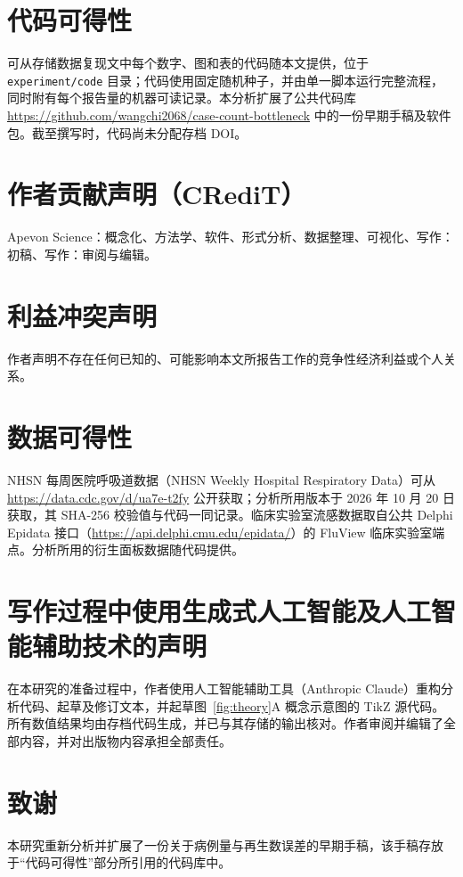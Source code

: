 \section*{代码可得性}
可从存储数据复现文中每个数字、图和表的代码随本文提供，位于 \texttt{experiment/code} 目录；代码使用固定随机种子，并由单一脚本运行完整流程，同时附有每个报告量的机器可读记录。本分析扩展了公共代码库 {\def\UrlBreaks{\do\/\do-}\url{https://github.com/wangchi2068/case-count-bottleneck}} 中的一份早期手稿及软件包。截至撰写时，代码尚未分配存档 DOI。

\section*{作者贡献声明（CRediT）}
Apevon Science：概念化、方法学、软件、形式分析、数据整理、可视化、写作：初稿、写作：审阅与编辑。

\section*{利益冲突声明}
作者声明不存在任何已知的、可能影响本文所报告工作的竞争性经济利益或个人关系。

\section*{数据可得性}
{\sloppy NHSN 每周医院呼吸道数据（NHSN Weekly Hospital Respiratory Data）可从 \url{https://data.cdc.gov/d/ua7e-t2fy} 公开获取；分析所用版本于 2026 年 10 月 20 日获取，其 SHA-256 校验值与代码一同记录。临床实验室流感数据取自公共 Delphi Epidata 接口（\mbox{\url{https://api.delphi.cmu.edu/epidata/}}）的 FluView 临床实验室端点。分析所用的衍生面板数据随代码提供。\par}

\section*{写作过程中使用生成式人工智能及人工智能辅助技术的声明}
在本研究的准备过程中，作者使用人工智能辅助工具（Anthropic Claude）重构分析代码、起草及修订文本，并起草图~\ref{fig:theory}A 概念示意图的 TikZ 源代码。所有数值结果均由存档代码生成，并已与其存储的输出核对。作者审阅并编辑了全部内容，并对出版物内容承担全部责任。

\section*{致谢}
本研究重新分析并扩展了一份关于病例量与再生数误差的早期手稿，该手稿存放于“代码可得性”部分所引用的代码库中。
